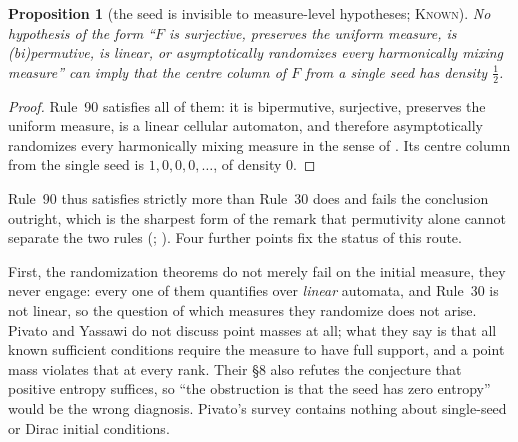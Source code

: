 \documentclass[11pt]{article}
\newtheorem{proposition}[theorem]{Proposition}
\theoremstyle{definition}
\theoremstyle{remark}
\newcommand{\KNOWN}{\textsc{Known}}
\begin{document}
\begin{proposition}[the seed is invisible to measure-level hypotheses; \KNOWN]\label{p2:rule90}
No hypothesis of the form ``$F$ is surjective, preserves the uniform measure, is (bi)permutive, is
linear, or asymptotically randomizes every harmonically mixing measure'' can imply that the centre
column of $F$ from a single seed has density $\tfrac12$.
\end{proposition}
\begin{proof}
Rule~90 satisfies all of them: it is bipermutive, surjective, preserves the uniform measure, is a
linear cellular automaton, and therefore asymptotically randomizes every harmonically mixing measure
in the sense of \cite{PY}. Its centre column from the single seed is $1,0,0,0,\dots$, of density $0$.
\end{proof}

Rule~90 thus satisfies strictly more than Rule~30 does and fails the conclusion outright, which is the
sharpest form of the remark that permutivity alone cannot separate the two rules
(\cite[\S4]{Kopra}; \cite[\S1]{Condrey}). Four further points fix the status of this route.

First, the randomization theorems do not merely fail on the initial measure, they never engage: every
one of them quantifies over \emph{linear} automata, and Rule~30 is not linear, so the question of
which measures they randomize does not arise. Pivato and Yassawi do not discuss point masses at all;
what they say is that all known sufficient conditions require the measure to have full support, and a
point mass violates that at every rank. Their \S8 also refutes the conjecture that positive entropy
suffices, so ``the obstruction is that the seed has zero entropy'' would be the wrong diagnosis.
Pivato's survey \cite{PivatoSurvey} contains nothing about single-seed or Dirac initial conditions.
\end{document}
